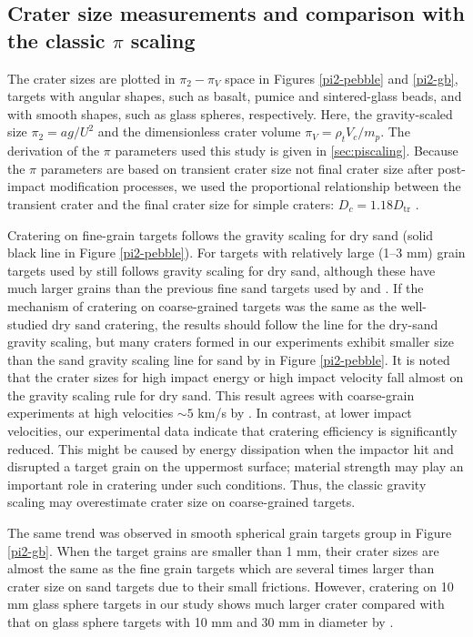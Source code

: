 \documentclass[3p,authoryear]{elsarticle}
\begin{document}
 \subsection{Crater size measurements and comparison with the classic $\pi$ scaling} \label{sec: classic pi}
The crater sizes are plotted in $\pi_2-\pi_V$ space \citep[e.g.][]{holsapple1993} in Figures \ref{pi2-pebble} and \ref{pi2-gb}, targets with angular shapes, such as basalt, pumice and sintered-glass beads, and with smooth shapes, such as glass spheres, respectively.
Here, the gravity-scaled size $\pi_2=ag/ U^2$ and the dimensionless crater volume $\pi_V=\rho_t V_c/m_p$.
The derivation of the $\pi$ parameters used this study is given in \ref{sec:piscaling}.
Because the $\pi$ parameters are based on transient crater size not final crater size after post-impact modification processes, we used the proportional relationship between the transient crater and the final crater size for simple craters: $D_c=1.18D_\text{tr}$ \citep{chapman1986,melosh1989}.

Cratering on fine-grain targets \citep{schmidt1980,mizutani1983,cintala1999} follows the gravity scaling for dry sand (solid black line in Figure \ref{pi2-pebble}).
For targets with relatively large (1--3 mm) grain targets used by \citet{cintala1999} still follows gravity scaling for dry sand, although these have much larger grains than the previous fine sand targets used by \citet{schmidt1980} and \citet{mizutani1983}.
If the mechanism of cratering on coarse-grained targets was the same as the well-studied dry sand cratering, the results should follow the line for the dry-sand gravity scaling, but many craters formed in our experiments exhibit smaller size than the sand gravity scaling line for sand by \citet{schmidt1987} in Figure \ref{pi2-pebble}.
It is noted that the crater sizes for high impact energy or high impact velocity fall almost on the gravity scaling rule for dry sand.
This result agrees with coarse-grain experiments at high velocities $\sim 5$ km/s by \citet{holsapple2014}.
In contrast, at lower impact velocities, our experimental data indicate that cratering efficiency is significantly reduced.
This might be caused by energy dissipation when the impactor hit and disrupted a target grain on the uppermost surface; material strength may play an important role in cratering under such conditions.
Thus, the classic gravity scaling may overestimate crater size on coarse-grained targets.

The same trend was observed in smooth spherical grain targets group in Figure \ref{pi2-gb}.
When the target grains are smaller than 1 mm, their crater sizes are almost the same as the fine grain targets which are several times larger than crater size on sand targets due to their small frictions.
However, cratering on 10 mm glass sphere targets in our study shows much larger crater compared with that on glass sphere targets with 10 mm and 30 mm in diameter by \citet{guettler2012}.
\end{document}
